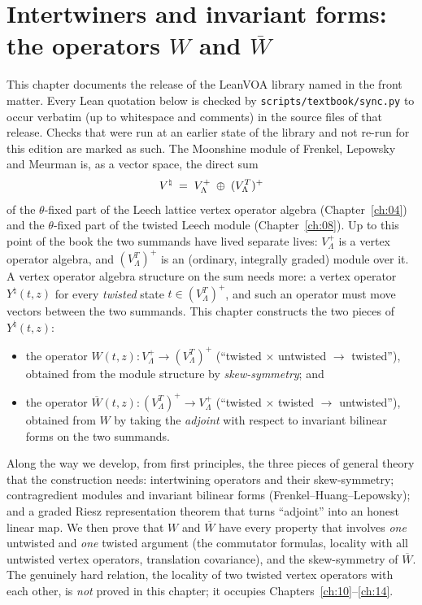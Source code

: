 \chapter{Intertwiners and invariant forms: the operators \texorpdfstring{$W$}{W} and \texorpdfstring{$\overline{W}$}{Wbar}}\label{ch:09}

\providecommand{\chnineVP}{V_{\Lambda}^{+}}
\providecommand{\chnineTP}{(V_{\Lambda}^{T})^{+}}
\providecommand{\chnineWb}{\overline{W}}
\providecommand{\chnineWd}{W^{\dagger}}
\providecommand{\chnineV}{\mathcal{V}}

This chapter documents the release of the LeanVOA library named in the front matter. Every Lean quotation below is checked by \texttt{scripts/textbook/sync.py} to occur verbatim (up to whitespace and comments) in the source files of that release. Checks that were run at an earlier state of the library and not re-run for this edition are marked as such.
The Moonshine module of Frenkel, Lepowsky and Meurman is, as a vector space, the direct sum
\begin{equation}\label{ch09:eq:vnat}
  \Vnat \;=\; \chnineVP \;\oplus\; \chnineTP
\end{equation}
of the $\theta$-fixed part of the Leech lattice vertex operator algebra (Chapter~\ref{ch:04})
and the $\theta$-fixed part of the twisted Leech module (Chapter~\ref{ch:08}). Up to this point
of the book the two summands have lived separate lives: $\chnineVP$ is a vertex operator
algebra, and $\chnineTP$ is an (ordinary, integrally graded) module over it. A vertex operator
algebra structure on the sum needs more: a vertex operator $Y^\natural(t,z)$ for every
\emph{twisted} state $t\in\chnineTP$, and such an operator must move vectors between the two
summands. This chapter constructs the two pieces of $Y^\natural(t,z)$:
\begin{itemize}
\item the operator $W(t,z)\colon \chnineVP\to\chnineTP$ (``twisted $\times$ untwisted $\to$
twisted''), obtained from the module structure by \emph{skew-symmetry}; and
\item the operator $\chnineWb(t,z)\colon \chnineTP\to\chnineVP$ (``twisted $\times$ twisted
$\to$ untwisted''), obtained from $W$ by taking the \emph{adjoint} with respect to invariant
bilinear forms on the two summands.
\end{itemize}
Along the way we develop, from first principles, the three pieces of general theory that the
construction needs: intertwining operators and their skew-symmetry; contragredient modules and
invariant bilinear forms (Frenkel--Huang--Lepowsky); and a graded Riesz representation theorem
that turns ``adjoint'' into an honest linear map. We then prove that $W$ and $\chnineWb$ have
every property that involves \emph{one} untwisted and \emph{one} twisted argument (the
commutator formulas, locality with all untwisted vertex operators, translation covariance), and
the skew-symmetry of $\chnineWb$. The genuinely hard relation, the locality of two twisted
vertex operators with each other, is \emph{not} proved in this chapter; it occupies
Chapters~\ref{ch:10}--\ref{ch:14}.

